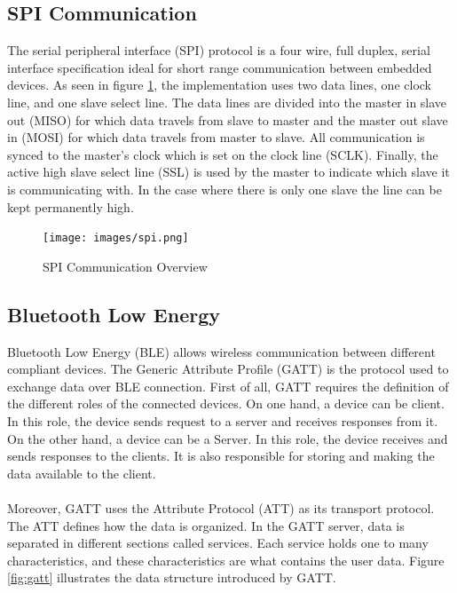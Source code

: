 \documentclass[12pt]{article}
\begin{document}
\subsection{SPI Communication}
The serial peripheral interface (SPI) protocol is a four wire, full duplex, serial interface specification ideal for short range communication between embedded devices. As seen in figure \ref{fig:spi}, the implementation uses two data lines, one clock line, and one slave select line. The data lines are divided into the master in slave out (MISO) for which data travels from slave to master and the master out slave in (MOSI) for which data travels from master to slave. All communication is synced to the master's clock which is set on the clock line (SCLK). Finally, the active high slave select line (SSL) is used by the master to indicate which slave it is communicating with. In the case where there is only one slave the line can be kept permanently high.

\begin{figure}[!htb]
  \centering
  \texttt{[image: images/spi.png]}
  \caption{SPI Communication Overview}
  \label{fig:spi}
 \end{figure}

\subsection{Bluetooth Low Energy}
Bluetooth Low Energy (BLE) allows wireless communication between different compliant devices. The Generic Attribute Profile (GATT) is the protocol used to exchange data over BLE connection. First of all, GATT requires the definition of the different roles of the connected devices. On one hand, a device can be client. In this role, the device sends request to a server and receives responses from it. On the other hand, a device can be a Server. In this role, the device receives and sends responses to the clients. It is also responsible for storing and making the data available to the client.
\paragraph{}
Moreover, GATT uses the Attribute Protocol (ATT) as its transport protocol. The ATT defines how the data is organized. In the GATT server, data is separated in different sections called services. Each service holds one to many characteristics, and these characteristics are what contains the user data. Figure \ref{fig:gatt} illustrates the data structure introduced by GATT.
\end{document}
